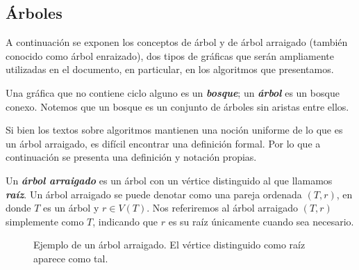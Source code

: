 \subsection{Árboles}

A continuación se exponen los conceptos de árbol y de árbol arraigado (también conocido como árbol enraizado), dos tipos de gráficas que serán ampliamente utilizadas en el documento, en particular, en los algoritmos que presentamos.

Una gráfica que no contiene ciclo alguno es un \emph{\textbf{bosque}}; un \emph{\textbf{árbol}} es un bosque conexo. Notemos que un bosque es un conjunto de árboles sin aristas entre ellos.

Si bien los textos sobre algoritmos mantienen una noción uniforme de lo que es un árbol arraigado, es difícil encontrar una definición formal. Por lo que a continuación se presenta una definición y notación propias.

Un \textbf{\emph{árbol arraigado}} es un árbol con un vértice distinguido al que llamamos \textbf{\emph{raíz}}. Un árbol arraigado se puede denotar como una pareja ordenada $(T,r)$, en donde $T$ es un árbol y $r \in V(T)$. Nos referiremos al árbol arraigado $(T,r)$ simplemente como $T$, indicando que $r$ es su raíz únicamente cuando sea necesario.

\begin{figure}[!htbp]
\centering
\begin{subfigure}{\textwidth}
\centering
{}
\end{subfigure}
\caption{Ejemplo de un árbol arraigado. El vértice distinguido como raíz aparece como tal.}
\label{fig_ejemplo_arbol}
\end{figure}

